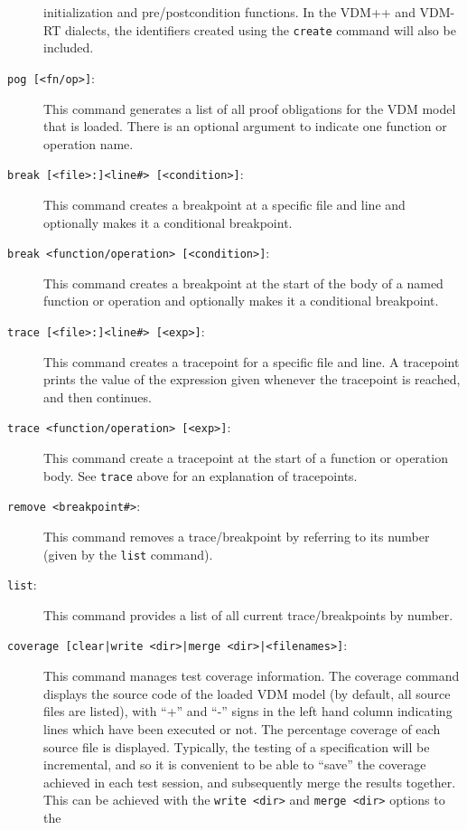 \documentclass{overturerepchap}
\begin{document}
\begin{description}
  initialization and pre/postcondition functions. In the VDM++ and
  VDM-RT dialects, the identifiers created using the \texttt{create}
  command will also be included. 
\item[\texttt{pog [<fn/op>]}:] This command generates a list of all proof
  obligations for the VDM model that is loaded. There is an optional argument
  to indicate one function or operation name.  
\item[\texttt{break [<file>:]<line\#> [<condition>]}:] This command
  creates a breakpoint at a specific file and line and optionally makes
  it a conditional breakpoint.  
\item[\texttt{break <function/operation> [<condition>]}:] This command
  creates a breakpoint at the start of the body of a named function or operation and
  optionally makes it a conditional breakpoint. 
\item[\texttt{trace [<file>:]<line\#> [<exp>]}:] This command creates a
  tracepoint for a specific file and line. A tracepoint prints the value of the
  expression given whenever the tracepoint is reached, and then continues.
\item[\texttt{trace <function/operation> [<exp>]}:] This command
  create a tracepoint at the start of a function or operation body.
  See \texttt{trace} above for an explanation of tracepoints.
\item[\texttt{remove <breakpoint\#>}:] This command removes a
  trace/breakpoint by referring to its number (given by the
  \texttt{list} command). 
\item[\texttt{list}:] This command provides a list of all current
  trace/breakpoints by number.  
\item[\texttt{coverage [clear|write <dir>|merge <dir>|<filenames>]}:]
  This command manages test coverage information.
  The coverage command displays the source
  code of the loaded VDM model (by default, all source files are
  listed), with ``+'' and ``-'' signs in the left hand column
  indicating lines which have been executed or not. The percentage
  coverage of each source file
  is displayed. Typically, the
  testing of a specification will be incremental, and so it is
  convenient to be able to ``save'' the coverage achieved in each test
  session, and subsequently merge the results together. This can be
  achieved with the \texttt{write <dir>} and \texttt{merge <dir>} options to the

\end{description}
\end{document}
